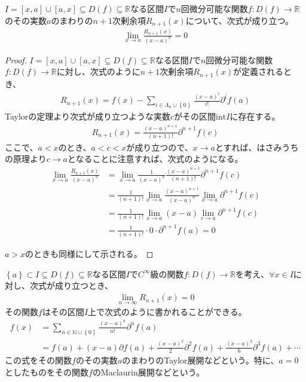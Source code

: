 \documentclass[dvipdfmx]{jsarticle}
\begin{document}
\begin{thm}\label{4.2.2.13}
$I = [ x,a] \cup [ a,x] \subseteq D(f) \subseteq \mathbb{R}$なる区間$I$で$n$回微分可能な関数$f:D(f) \rightarrow \mathbb{R}$のその実数$a$のまわりの$n + 1$次剰余項$R_{n + 1}(x)$について、次式が成り立つ。
\begin{align*}
\lim_{x \rightarrow a}\frac{R_{n + 1}(x)}{(x - a)^{n}} = 0
\end{align*}
\end{thm}
\begin{proof}
$I = [ x,a] \cup [ a,x] \subseteq D(f) \subseteq \mathbb{R}$なる区間$I$で$n$回微分可能な関数$f:D(f) \rightarrow \mathbb{R}$に対し、次式のように$n + 1$次剰余項$R_{n + 1}(x)$が定義されるとき、
\begin{align*}
R_{n + 1}(x) = f(x) - \sum_{i \in \varLambda_{n} \cup \left\{ 0 \right\}} {\frac{(x - a)^{i}}{i!}\partial^{i}f(a)}
\end{align*}
Taylorの定理より次式が成り立つような実数$c$がその区間$\mathrm{int}I$に存在する。
\begin{align*}
R_{n + 1}(x) = \frac{(x - a)^{n + 1}}{(n + 1)!}\partial^{n + 1}f(c)
\end{align*}
ここで、$a < x$のとき、$a < c < x$が成り立つので、$x \rightarrow a$とすれば、はさみうちの原理より$c \rightarrow a$となることに注意すれば、次式のようになる。
\begin{align*}
\lim_{x \rightarrow a}\frac{R_{n + 1}(x)}{(x - a)^{n}} &= \lim_{x \rightarrow a}{\frac{1}{(x - a)^{n}}\frac{(x - a)^{n + 1}}{(n + 1)!}\partial^{n + 1}f(c)}\\
&= \frac{1}{(n + 1)!}\lim_{x \rightarrow a}\frac{(x - a)^{n + 1}}{(x - a)^{n}}\lim_{x \rightarrow a}{\partial^{n + 1}f(c)}\\
&= \frac{1}{(n + 1)!}\lim_{x \rightarrow a}(x - a)\lim_{c \rightarrow a}{\partial^{n + 1}f(c)}\\
&= \frac{1}{(n + 1)!} \cdot 0 \cdot \partial^{n + 1}f(a) = 0
\end{align*}\par
$a > x$のときも同様にして示される。
\end{proof}
\begin{thm}[Taylor展開]\label{4.2.2.14}
$\left\{ a \right\} \subset I \subseteq D(f) \subseteq \mathbb{R}$なる区間$I$で$C^{\infty}$級の関数$f:D(f) \rightarrow \mathbb{R}$を考え、$\forall x \in I$に対し、次式が成り立つとき、
\begin{align*}
\lim_{n \rightarrow \infty}{R_{n + 1}(x)} = 0
\end{align*}
その関数$f$はその区間$I$上で次式のように書かれることができる。
\begin{align*}
f(x) &= \sum_{n \in \mathbb{N} \cup \left\{ 0 \right\}} {\frac{(x - a)^n}{n!}\partial^n f(a)}\\
&= f(a) + (x - a)\partial f(a) + \frac{(x - a)^{2}}{2}\partial^{2}f(a) + \frac{(x - a)^{3}}{6}\partial^{3}f(a) + \cdots
\end{align*}
この式をその関数$f$のその実数$a$のまわりのTaylor展開などという。特に、$a = 0$としたものをその関数$f$のMaclaurin展開などという。
\end{thm}
\end{document}
